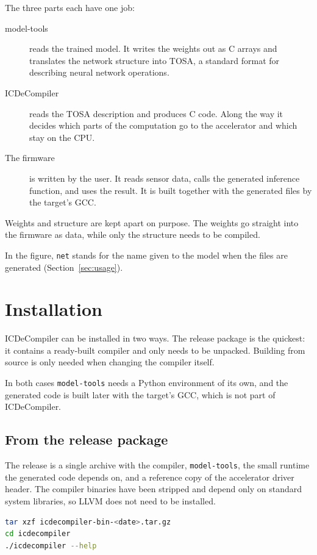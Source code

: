 \documentclass[11pt,a4paper]{article}
\begin{document}
The three parts each have one job:

\begin{description}
  \item[model-tools] reads the trained model. It writes the weights out as C
    arrays and translates the network structure into TOSA, a standard format
    for describing neural network operations.
  \item[ICDeCompiler] reads the TOSA description and produces C code. Along
    the way it decides which parts of the computation go to the accelerator
    and which stay on the CPU.
  \item[The firmware] is written by the user. It reads sensor data, calls the
    generated inference function, and uses the result. It is built together
    with the generated files by the target's GCC.
\end{description}

Weights and structure are kept apart on purpose. The weights go straight into
the firmware as data, while only the structure needs to be compiled.

In the figure, \texttt{net} stands for the name given to the model when the
files are generated (Section~\ref{sec:usage}).

\section{Installation}

ICDeCompiler can be installed in two ways. The release package is the
quickest: it contains a ready-built compiler and only needs to be unpacked.
Building from source is only needed when changing the compiler itself.

In both cases \texttt{model-tools} needs a Python environment of its own, and
the generated code is built later with the target's GCC, which is not part of
ICDeCompiler.

\subsection{From the release package}

The release is a single archive with the compiler, \texttt{model-tools}, the
small runtime the generated code depends on, and a reference copy of the
accelerator driver header. The compiler binaries have been stripped and depend
only on standard system libraries, so LLVM does not need to be installed.

\begin{lstlisting}[language=bash]
tar xzf icdecompiler-bin-<date>.tar.gz
cd icdecompiler
./icdecompiler --help
\end{lstlisting}
\end{document}
